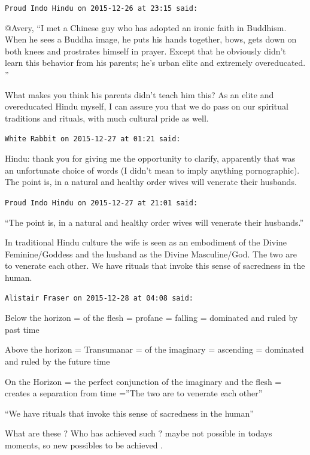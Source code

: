 \begin{footnotesize}
\begin{sffamily}
\hfill

\texttt{Proud Indo Hindu on 2015-12-26 at 23:15 said:}

@Avery, ``I met a Chinese guy who has adopted an ironic faith in Buddhism. When he sees a Buddha image, he puts his hands together, bows, gets down on both knees and prostrates himself in prayer. Except that he obviously didn't learn this behavior from his parents; he's urban elite and extremely overeducated. ''

What makes you think his parents didn't teach him this? As an elite and overeducated Hindu myself, I can assure you that we do pass on our spiritual traditions and rituals, with much cultural pride as well.

\hfill

\texttt{White Rabbit on 2015-12-27 at 01:21 said:}

Hindu: thank you for giving me the opportunity to clarify, apparently that was an unfortunate choice of words (I didn't mean to imply anything pornographic). The point is, in a natural and healthy order wives will venerate their husbands.

\hfill

\texttt{Proud Indo Hindu on 2015-12-27 at 21:01 said:}

``The point is, in a natural and healthy order wives will venerate their husbands.''

In traditional Hindu culture the wife is seen as an embodiment of the Divine Feminine/Goddess and the husband as the Divine Masculine/God. The two are to venerate each other. We have rituals that invoke this sense of sacredness in the human.

\hfill

\texttt{Alistair Fraser on 2015-12-28 at 04:08 said:}

Below the horizon = of the flesh = profane = falling = dominated and ruled by past time

Above the horizon = Transumanar = of the imaginary = ascending = dominated and ruled by the future time

On the Horizon = the perfect conjunction of the imaginary and the flesh = creates a separation from time =''The two are to venerate each other''

``We have rituals that invoke this sense of sacredness in the human''

What are these ? Who has achieved such ? maybe not possible in todays moments, so new possibles to be achieved .

\hfill


\end{sffamily}
\end{footnotesize}

